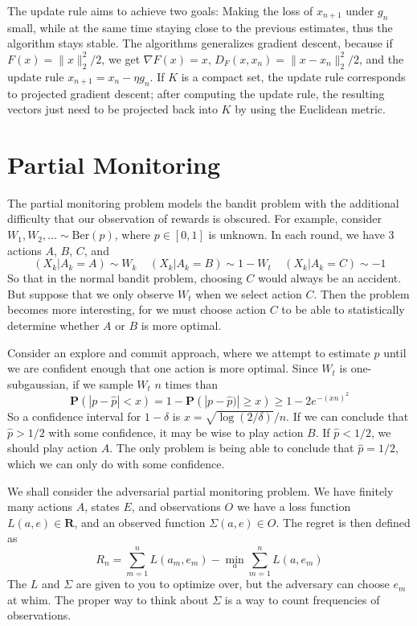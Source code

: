 The update rule aims to achieve two goals: Making the loss of $x_{n+1}$ under $g_n$ small, while at the same time staying close to the previous estimates, thus the algorithm stays stable. The algorithms generalizes gradient descent, because if $F(x) = \| x \|_2^2/2$, we get $\nabla F(x) = x$, $D_F(x,x_n) = \| x - x_n \|_2^2/2$, and the update rule $x_{n+1} = x_n - \eta g_n$. If $K$ is a compact set, the update rule corresponds to projected gradient descent; after computing the update rule, the resulting vectors just need to be projected back into $K$ by using the Euclidean metric.

\chapter{Partial Monitoring}

The partial monitoring problem models the bandit problem with the additional difficulty that our observation of rewards is obscured. For example, consider $W_1, W_2, \dots \sim \text{Ber}(p)$, where $p \in [0,1]$ is unknown. In each round, we have 3 actions $A$, $B$, $C$, and
%
\[ (X_k | A_k = A) \sim W_k\ \ \ \ \ (X_k | A_k = B) \sim 1 - W_t\ \ \ \ \ (X_k | A_k = C) \sim -1 \]
%
So that in the normal bandit problem, choosing $C$ would always be an accident. But suppose that we only observe $W_t$ when we select action $C$. Then the problem becomes more interesting, for we must choose action $C$ to be able to statistically determine whether $A$ or $B$ is more optimal.

Consider an explore and commit approach, where we attempt to estimate $p$ until we are confident enough that one action is more optimal. Since $W_t$ is one-subgaussian, if we sample $W_t$ $n$ times than
%
\[ \mathbf{P}(|p - \widehat{p}| < x) = 1 - \mathbf{P}(|p - \widehat{p})| \geq x) \geq 1 - 2e^{-(xn)^2} \]
%
So a confidence interval for $1 - \delta$ is $x = \sqrt{\log(2/\delta)}/n$. If we can conclude that $\widehat{p} > 1/2$ with some confidence, it may be wise to play action $B$. If $\widehat{p} < 1/2$, we should play action $A$. The only problem is being able to conclude that $\widehat{p} = 1/2$, which we can only do with some confidence.

We shall consider the adversarial partial monitoring problem. We have finitely many actions $A$, states $E$, and observations $O$ we have a loss function $L(a,e) \in \mathbf{R}$, and an observed function $\Sigma(a,e) \in O$. The regret is then defined as
%
\[ R_n = \sum_{m = 1}^n L(a_m,e_m) - \min_a \sum_{m = 1}^n L(a,e_m) \]
%
The $L$ and $\Sigma$ are given to you to optimize over, but the adversary can choose $e_m$ at whim. The proper way to think about $\Sigma$ is a way to count frequencies of observations.


